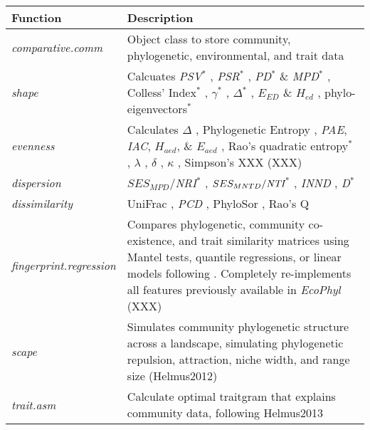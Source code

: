\documentclass[11pt]{article} %
\begin{document}
\begin{table}
\begin{center}
\begin{tabular}{p{3.5cm} p{14cm}}
  Function & Description\\\hline
  \emph{comparative.comm} & Object class to store community, phylogenetic, environmental, and trait data\\
  \emph{shape} & Calcuates \emph{PSV}$^*$ \autocite{Helmus2007}, \emph{PSR}$^*$ \autocite{Helmus2007}, \emph{PD}$^*$ \& \emph{MPD}$^*$ \autocite{Faith1992}, Colless' Index$^*$ \autocite{Colless1982}, $\gamma$$^*$ \autocite{Pybus2000}, $\Delta$$^*$ \autocite{Warwick1995}, $E_{ED}$ \& $H_{ed}$ \autocite{Cadotte2010}, phylo-eigenvectors$^*$ \autocite{Diniz-Filho2011}\\
  \emph{evenness} & Calculates $\Delta$ \autocite{Warwick1995}, Phylogenetic Entropy \autocite{Allen2009}, \emph{PAE}, \emph{IAC}, $H_{aed}$, \& $E_{aed}$ \autocite{Cadotte2010}, Rao's quadratic entropy$^*$ \autocite{Rao1982a}, $\lambda$ \autocite{Pagel1999}, $\delta$ \autocite{Pagel1999}, $\kappa$ \autocite{Pagel1999}, Simpson's XXX (XXX)\\
  \emph{dispersion} & $SES_{MPD}$/\emph{NRI}$^*$ \autocite{Webb2000,Webb2002,Kembel2009}, $SES_{MNTD}/\emph{NTI}$$^*$ \autocite{Webb2000,Webb2002,Kembel2009}, \emph{INND} \autocite{Ness2011}, \emph{D}$^*$ \autocite{Fritz2010}\\
\emph{dissimilarity} &  UniFrac \autocite{Lozupone2005}, \emph{PCD} \autocite{Helmus2010}, PhyloSor \autocite{Bryant2008}, Rao's Q \autocite{Rao1982a}\\
  \emph{fingerprint.regression} & Compares phylogenetic, community co-existence, and trait similarity matrices using Mantel tests, quantile regressions, or linear models following \autocite{Cavender-Bares2004,Cavender-Bares2006}. Completely re-implements all features previously available in \emph{EcoPhyl} (XXX) \\
  \emph{scape} & Simulates community phylogenetic structure across a landscape, simulating phylogenetic repulsion, attraction, niche width, and range size (Helmus2012)\\ %

  \emph{trait.asm} & Calculate optimal traitgram that explains community data, following Helmus2013\\ %


\end{tabular}
\end{center}
\end{table}
\end{document}
